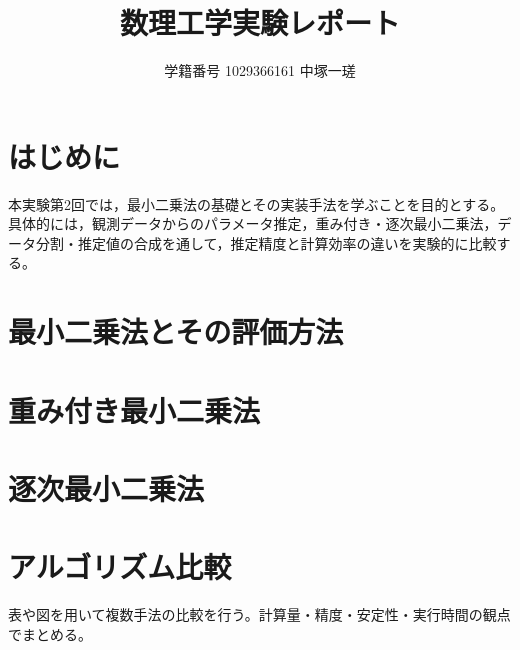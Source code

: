 \documentclass[a4paper,11pt]{ltjsarticle}
\title{数理工学実験レポート\\[4pt]\large \ChapterTitle}
\author{学籍番号 1029366161 \quad 中塚一瑳}
\date{\ExperimentDate}
\newcommand{\R}{\mathbb{R}}
\begin{document}
\maketitle
\begin{abstract}
\end{abstract}

\tableofcontents
\clearpage


\section{はじめに}
本実験第2回では，最小二乗法の基礎とその実装手法を学ぶことを目的とする。具体的には，観測データからのパラメータ推定，重み付き・逐次最小二乗法，データ分割・推定値の合成を通して，推定精度と計算効率の違いを実験的に比較する。


\section{最小二乗法とその評価方法}



\section{重み付き最小二乗法}



\section{逐次最小二乗法}





\section{アルゴリズム比較}
表や図を用いて複数手法の比較を行う。計算量・精度・安定性・実行時間の観点でまとめる。
\end{document}
